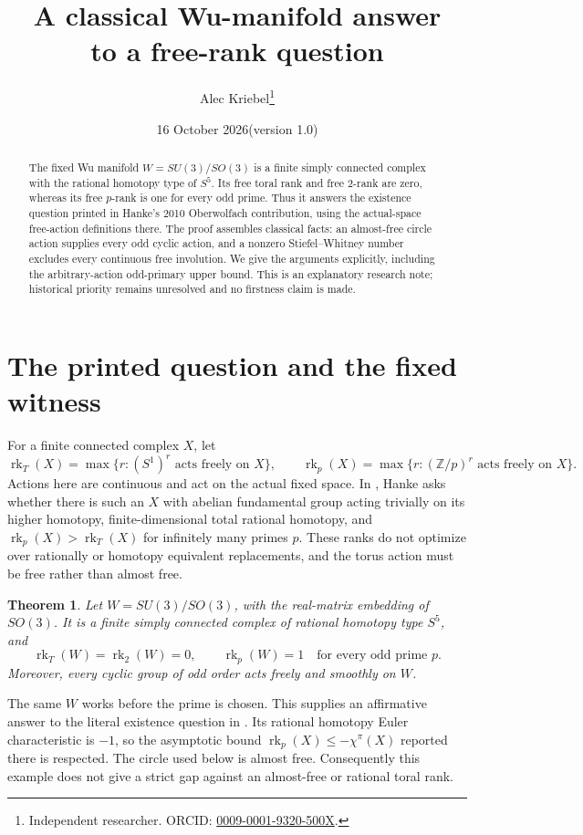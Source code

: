 \documentclass[10pt]{article}
\title{A classical Wu-manifold answer\\ to a free-rank question}
\author{Alec Kriebel\thanks{Independent researcher. ORCID:
\href{https://orcid.org/0009-0001-9320-500X}{0009-0001-9320-500X}.}}
\date{16 October 2026\quad (version 1.0)}
\newtheorem{theorem}{Theorem}
\newcommand{\rk}{\operatorname{rk}}
\begin{document}
\maketitle
\begin{abstract}
The fixed Wu manifold \(W=SU(3)/SO(3)\) is a finite simply connected complex
with the rational homotopy type of \(S^5\). Its free toral rank and free
\(2\)-rank are zero, whereas its free \(p\)-rank is one for every odd prime.
Thus it answers the existence question printed in Hanke's 2010 Oberwolfach
contribution, using the actual-space free-action definitions there.
The proof assembles classical facts: an almost-free circle action supplies
every odd cyclic action, and a nonzero Stiefel--Whitney number excludes
every continuous free involution. We give the arguments explicitly,
including the arbitrary-action odd-primary upper bound. This is an
explanatory research note; historical priority remains unresolved and no
firstness claim is made.
\end{abstract}

\section{The printed question and the fixed witness}
For a finite connected complex \(X\), let
\[
 \rk_T(X)=\max\{r:(S^1)^r\text{ acts freely on }X\},\qquad
 \rk_p(X)=\max\{r:(\mathbb Z/p)^r\text{ acts freely on }X\}.
\]
Actions here are continuous and act on the actual fixed space.
In \cite[p.~1912]{H}, Hanke asks whether there is such an \(X\) with
abelian fundamental group acting trivially on its higher homotopy,
finite-dimensional total rational homotopy, and
\(\rk_p(X)>\rk_T(X)\) for infinitely many primes \(p\).
These ranks do not optimize over rationally or homotopy equivalent
replacements, and the torus action must be free rather than almost free.

\begin{theorem}\label{main}
Let \(W=SU(3)/SO(3)\), with the real-matrix embedding of \(SO(3)\).
It is a finite simply connected complex of rational homotopy type \(S^5\),
and
\[
 \rk_T(W)=\rk_2(W)=0,\qquad
 \rk_p(W)=1\quad\text{for every odd prime }p.
\]
Moreover, every cyclic group of odd order acts freely and smoothly on \(W\).
\end{theorem}

The same \(W\) works before the prime is chosen. This supplies an affirmative
answer to the literal existence question in \cite{H}.
Its rational homotopy Euler characteristic is \(-1\), so the asymptotic
bound \(\rk_p(X)\le-\chi^\pi(X)\) reported there is respected.
The circle used below is almost free. Consequently this example does
not give a strict gap against an almost-free or rational toral rank.
\end{document}
